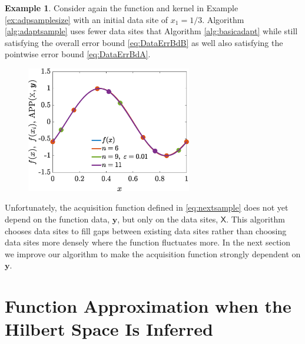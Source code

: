 \documentclass[]{mcom-l}
\theoremstyle{plain}
\theoremstyle{definition}
\newtheorem{example}{Example}
\newcommand{\mX}{\mathsf{X}}
\newcommand{\by}{{\boldsymbol{y}}}
\begin{document}
\begin{example}
\label{ex:adpdataselect}
Consider again the function and kernel in Example \ref{ex:adpsamplesize} with an initial data site of $x_1=1/3$.
Algorithm \ref{alg:adaptsample} uses fewer data sites that Algorithm \ref{alg:basicadapt} while still satisfying the overall error bound \eqref{eq:DataErrBdB} as well also satisfying the pointwise error bound \eqref{eq:DataErrBdA}.
	

	
	
	\begin{figure}[H]
		\centering
		\includegraphics[height = 5.5cm]{ProgramsImages/AdaptAlgo2_sinFun_GaussKernel_adapt_th_EmpBayesAx_theta_1.eps}
		\caption{ \label{fig:ex2}}
	\end{figure}
	
\end{example}


Unfortunately, the acquisition function defined in \eqref{eq:nextsample} does not yet depend on the function data, $\by$, but only on the data sites, $\mX$.  This algorithm chooses data sites to fill gaps between existing data sites rather than choosing data sites more densely where the function fluctuates more.  In the next section we improve our algorithm to make the acquisition function strongly dependent on $\by$.





\section{Function Approximation when the Hilbert Space Is Inferred} \label{sec:adaptF}
\end{document}
